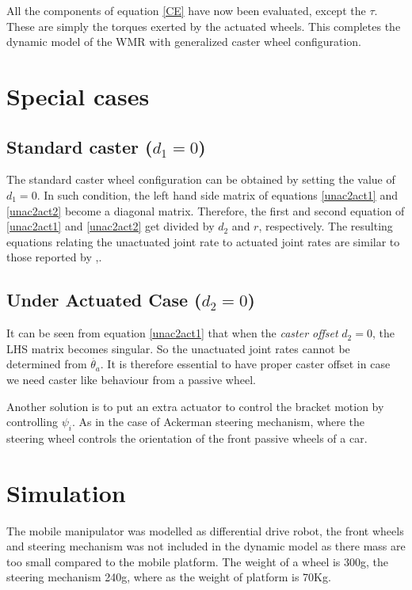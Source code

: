 All the components of  equation  \ref{CE}  have now been evaluated, except the $\tau$. These are simply the torques exerted by the actuated wheels. This completes the dynamic model of the WMR with generalized caster wheel configuration.








\section{Special cases}
\subsection{Standard caster ($d_1=0$) }
The  standard caster wheel configuration can be obtained by setting the value of $d_1=0$. In such condition, the left hand side matrix of  equations \ref{unac2act1} and \ref{unac2act2} become  a diagonal matrix. Therefore, the first and second equation of \ref{unac2act1} and \ref{unac2act2} get divided by $d_2$ and $r$, respectively. The resulting  equations relating the unactuated joint rate to  actuated joint rates are similar to those reported by \cite{saha1991dynamics},\cite{angeles2013fundamentals}.
\subsection{Under Actuated Case ($d_2=0$)}
It can be seen from equation \ref{unac2act1} that when the \textit{caster offset} $d_2=0$, the LHS matrix becomes singular. So the unactuated joint rates cannot be determined from $\dot{\theta_a}$. It is therefore essential to have proper caster offset in case we need caster like behaviour from a passive wheel. 

Another solution is to put an extra actuator to control the bracket motion by controlling $\psi_i$. As in the case of Ackerman steering mechanism, where the steering wheel controls the orientation of the front passive wheels of a car.

\section{Simulation }
 
The mobile manipulator was modelled as differential drive robot, the front wheels and steering mechanism was not included in the dynamic model as there mass are too small compared to the mobile platform. The weight of a wheel is 300g, the steering mechanism 240g, where as the weight of platform is 70Kg.


